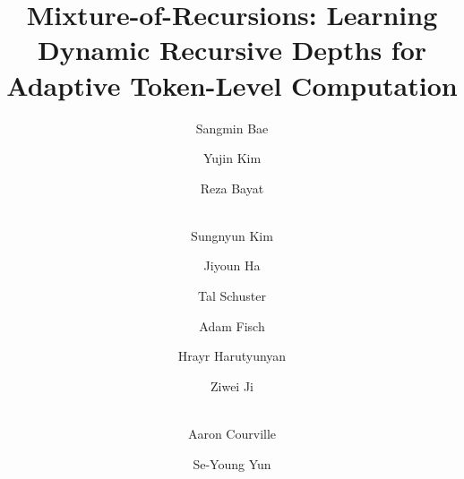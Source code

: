 \documentclass[10pt,letterpaper]{paper}
\title{Mixture-of-Recursions: Learning Dynamic Recursive Depths for Adaptive Token-Level Computation}
\author[1,\footnotesize{\textbf{*}}]{Sangmin Bae}
\author[1,\footnotesize{\textbf{*}}]{Yujin Kim}
\author[2,\footnotesize{\textbf{*}}]{Reza Bayat}
\author[1]{\\Sungnyun Kim}
\author[3]{Jiyoun Ha}
\author[4]{Tal Schuster}
\author[4]{Adam Fisch}
\author[5]{Hrayr Harutyunyan}
\author[4]{Ziwei Ji}
\author[2,6,\footnotesize{$\dagger$}]{\\Aaron Courville}
\author[1,\footnotesize{$\dagger$}]{Se-Young Yun}
\affil[1]{KAIST AI}
\affil[2]{Mila}
\affil[3]{Google Cloud}
\affil[4]{Google DeepMind}
\affil[5]{Google Research}
\affil[6]{Université de Montréal}
\begin{document}
\maketitle











\clearpage
\appendix{}
\end{document}
